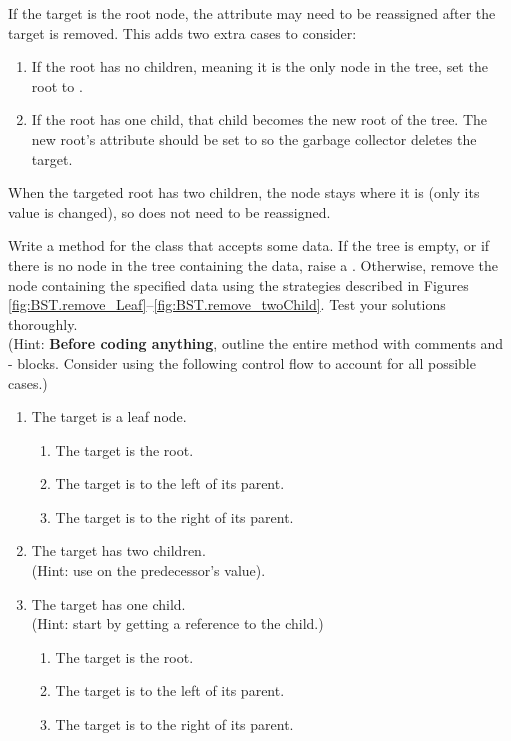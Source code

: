 If the target is the root node, the  attribute may need to be reassigned after the target is removed.
This adds two extra cases to consider:
\begin{enumerate}
\item If the root has no children, meaning it is the only node in the tree, set the root to .
\item If the root has one child, that child becomes the new root of the tree.
The new root's  attribute should be set to  so the garbage collector deletes the target.
\end{enumerate}
When the targeted root has two children, the node stays where it is (only its value is changed), so  does not need to be reassigned.

\begin{problem} %
\label{prob:bst-remove}
Write a  method for the  class that accepts some data.
If the tree is empty, or if there is no node in the tree containing the data, raise a .
Otherwise, remove the node containing the specified data using the strategies described in Figures \ref{fig:BST.remove_Leaf}--\ref{fig:BST.remove_twoChild}.
Test your solutions thoroughly.
\\(Hint: \textbf{Before coding anything}, outline the entire method with comments and - blocks.
Consider using the following control flow to account for all possible cases.)
\newpage
\begin{enumerate}
    \item The target is a leaf node.
    \begin{enumerate}
        \item The target is the root.
        \item The target is to the left of its parent.
        \item The target is to the right of its parent.
    \end{enumerate}
    \item The target has two children.
    \\(Hint: use  on the predecessor's value).
    \item The target has one child.
    \\(Hint: start by getting a reference to the child.)
    \begin{enumerate}
        \item The target is the root.
        \item The target is to the left of its parent.
        \item The target is to the right of its parent.
    \end{enumerate}
\end{enumerate}
\end{problem}

